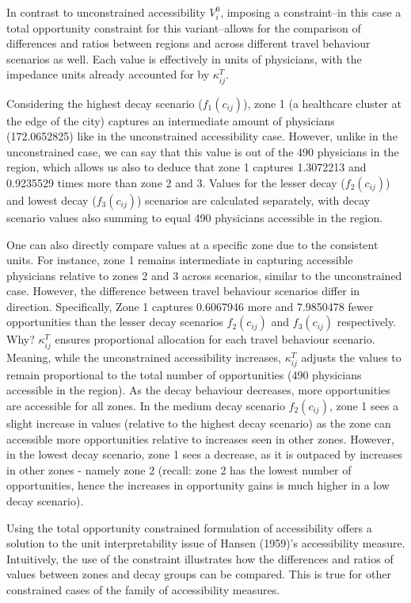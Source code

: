 \documentclass[
11pt, %
oneside, %
english, %
singlespacing, %
]{macthesis} %
\begin{document}


In contrast to unconstrained accessibility \(V^0_i\), imposing a constraint--in this case a total opportunity constraint for this variant--allows for the comparison of differences and ratios between regions and across different travel behaviour scenarios as well. Each value is effectively in units of physicians, with the impedance units already accounted for by \(\kappa_{ij}^T\).

Considering the highest decay scenario (\(f_1(c_{ij})\)), zone 1 (a healthcare cluster at the edge of the city) captures an intermediate amount of physicians (172.0652825) like in the unconstrained accessibility case. However, unlike in the unconstrained case, we can say that this value is out of the 490 physicians in the region, which allows us also to deduce that zone 1 captures 1.3072213 and 0.9235529 times more than zone 2 and 3. Values for the lesser decay (\(f_2(c_{ij})\)) and lowest decay (\(f_3(c_{ij})\)) scenarios are calculated separately, with decay scenario values also summing to equal 490 physicians accessible in the region.

One can also directly compare values at a specific zone due to the consistent units. For instance, zone 1 remains intermediate in capturing accessible physicians relative to zones 2 and 3 across scenarios, similar to the unconstrained case. However, the difference between travel behaviour scenarios differ in direction. Specifically, Zone 1 captures 0.6067946 more and 7.9850478 fewer opportunities than the lesser decay scenarios \(f_2(c_{ij})\) and \(f_3(c_{ij})\) respectively. Why? \(\kappa_{ij}^T\) ensures proportional allocation for each travel behaviour scenario. Meaning, while the unconstrained accessibility increases, \(\kappa_{ij}^T\) adjusts the values to remain proportional to the total number of opportunities (490 physicians accessible in the region). As the decay behaviour decreases, more opportunities are accessible for all zones. In the medium decay scenario \(f_2(c_{ij})\), zone 1 sees a slight increase in values (relative to the highest decay scenario) as the zone can accessible more opportunities relative to increases seen in other zones. However, in the lowest decay scenario, zone 1 sees a decrease, as it is outpaced by increases in other zones - namely zone 2 (recall: zone 2 has the lowest number of opportunities, hence the increases in opportunity gains is much higher in a low decay scenario).

Using the total opportunity constrained formulation of accessibility offers a solution to the unit interpretability issue of Hansen (1959)'s accessibility measure. Intuitively, the use of the constraint illustrates how the differences and ratios of values between zones and decay groups can be compared. This is true for other constrained cases of the family of accessibility measures.
\end{document}
